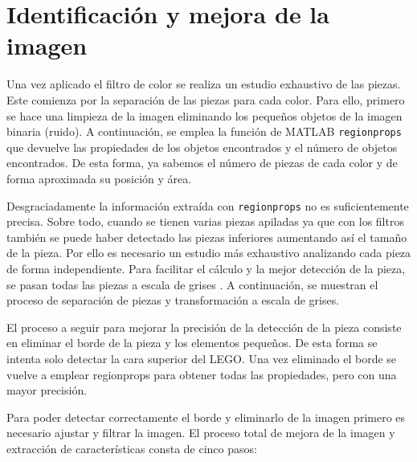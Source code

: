 \clearpage
\section{Identificación y mejora de la imagen}
Una vez aplicado el filtro de color se realiza un estudio exhaustivo de las piezas. Este comienza por la separación de las piezas para cada color. Para ello, primero se hace una limpieza de la imagen eliminando los pequeños objetos de la imagen binaria (ruido). A continuación, se emplea la función de MATLAB \texttt{regionprops} que devuelve las propiedades de los objetos encontrados y el número de objetos encontrados. De esta forma, ya sabemos el número de piezas de cada color y de forma aproximada su posición y área.

Desgraciadamente la información extraída con \texttt{regionprops} no es suficientemente precisa. Sobre todo, cuando se tienen varias piezas apiladas ya que con los filtros también se puede haber detectado las piezas inferiores aumentando así el tamaño de la pieza. Por ello es necesario un estudio más exhaustivo analizando cada pieza de forma independiente. Para facilitar el cálculo y la mejor detección de la pieza, se pasan todas las piezas a escala de grises \citep{greyscale}. A continuación, se muestran el proceso de separación de piezas y transformación a escala de grises.

El proceso a seguir para mejorar la precisión de la detección de la pieza consiste en eliminar el borde de la pieza y los elementos pequeños. De esta forma se intenta solo detectar la cara superior del LEGO. Una vez eliminado el borde se vuelve a emplear regionprops para obtener todas las propiedades, pero con una mayor precisión.

Para poder detectar correctamente el borde y eliminarlo de la imagen primero es necesario ajustar y filtrar la imagen. El proceso total de mejora de la imagen y extracción de características consta de cinco pasos:

